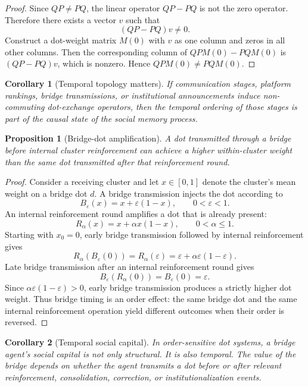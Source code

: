 \documentclass[11pt]{article}
\newtheorem{proposition}{Proposition}
\newtheorem{corollary}{Corollary}
\theoremstyle{remark}
\begin{document}
\begin{proof}
Since $QP\neq PQ$, the linear operator $QP-PQ$ is not the zero operator.
Therefore there exists a vector $v$ such that
$$
(QP-PQ)v\neq 0.
$$
Construct a dot-weight matrix $M(0)$ with $v$ as one column and zeros in
all other columns. Then the corresponding column of $QPM(0)-PQM(0)$ is
$(QP-PQ)v$, which is nonzero. Hence $QPM(0)\neq PQM(0)$.
\end{proof}

\begin{corollary}[Temporal topology matters]\label{cor:temporal-topology-matters}
If communication stages, platform rankings, bridge transmissions, or
institutional announcements induce non-commuting dot-exchange operators,
then the temporal ordering of those stages is part of the causal state
of the social memory process.
\end{corollary}


\begin{proposition}[Bridge-dot amplification]\label{prop:bridge-dot-amplification}
A dot transmitted through a bridge before internal cluster reinforcement
can achieve a higher within-cluster weight than the same dot transmitted
after that reinforcement round.
\end{proposition}

\begin{proof}
Consider a receiving cluster and let $x\in[0,1]$ denote the cluster's
mean weight on a bridge dot $d$. A bridge transmission injects the dot
according to
$$
B_\varepsilon(x)=x+\varepsilon(1-x),
\qquad 0<\varepsilon<1.
$$
An internal reinforcement round amplifies a dot that is already present:
$$
R_\alpha(x)=x+\alpha x(1-x),
\qquad 0<\alpha\leq1.
$$
Starting with $x_0=0$, early bridge transmission followed by internal
reinforcement gives
$$
R_\alpha(B_\varepsilon(0))
=R_\alpha(\varepsilon)
=\varepsilon+\alpha\varepsilon(1-\varepsilon).
$$
Late bridge transmission after an internal reinforcement round gives
$$
B_\varepsilon(R_\alpha(0))
=B_\varepsilon(0)
=\varepsilon.
$$
Since $\alpha\varepsilon(1-\varepsilon)>0$, early bridge transmission
produces a strictly higher dot weight. Thus bridge timing is an order
effect: the same bridge dot and the same internal reinforcement
operation yield different outcomes when their order is reversed.
\end{proof}

\begin{corollary}[Temporal social capital]\label{cor:temporal-social-capital}
In order-sensitive dot systems, a bridge agent's social capital is not
only structural. It is also temporal. The value of the bridge depends on
whether the agent transmits a dot before or after relevant reinforcement,
consolidation, correction, or institutionalization events.
\end{corollary}
\end{document}
